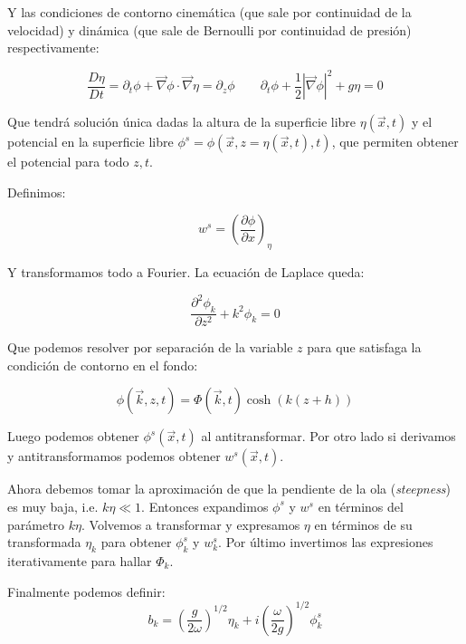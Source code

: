 Y las condiciones de contorno cinemática (que sale por continuidad de la velocidad) y dinámica (que sale de Bernoulli por continuidad de presión) respectivamente:

\begin{equation}
	\frac{D\eta}{Dt} = \partial_t \phi + \vec \nabla \phi \cdot \vec \nabla \eta = \partial_z \phi	 \qquad  \partial_t \phi + \frac{1}{2} |\vec \nabla \phi|^2 + g\eta = 0
\end{equation}

Que tendrá solución única dadas la altura de la superficie libre $\eta(\vec x,t)$ y el potencial en la superficie libre $\phi^s=\phi(\vec x, z=\eta(\vec x, t), t)$, que permiten obtener el potencial para todo $z, t$. \cite{meiTheoryApplicationsOcean2016}

Definimos:

\begin{equation}
	w^s = \left(\frac{\partial\phi}{\partial x}\right)_\eta
\end{equation} 

Y transformamos todo a Fourier. La ecuación de Laplace queda:

\begin{equation}
	\frac{\partial^2\phi_k}{\partial z^2} + k^2 \phi_k = 0
\end{equation}

Que podemos resolver por separación de la variable $z$ para que satisfaga la condición de contorno en el fondo:

\begin{equation}
	\phi(\vec k, z, t) = \Phi(\vec k, t) \cosh(k(z+h))
\end{equation}

Luego podemos obtener $\phi^s(\vec x, t)$ al antitransformar. Por otro lado si derivamos y antitransformamos podemos obtener $w^s(\vec x, t)$.

Ahora debemos tomar la aproximación de que la pendiente de la ola (\textit{steepness}) es muy baja, i.e. $k\eta\ll1$. Entonces expandimos $\phi^s$ y $w^s$ en términos del parámetro $k\eta$. Volvemos a transformar y expresamos $\eta$ en términos de su transformada $\eta_k$ para obtener $\phi^s_k$ y $w^s_k$. Por último invertimos las expresiones iterativamente para hallar $\Phi_k$. 

Finalmente podemos definir:
\begin{equation}
	b_k = \left(\frac{g}{2\omega}\right)^{1/2} \eta_k + i \left(\frac{\omega}{2g}\right)^{1/2}\phi^s_k
\end{equation}

